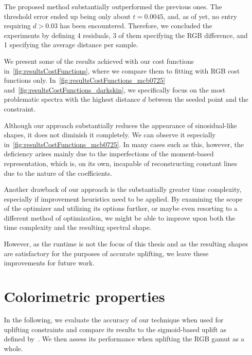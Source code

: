 The proposed method substantially outperformed the previous ones. The threshold error ended up being only about $t = 0.0045$, and, as of yet, no entry requiring $d > 0.03$ has been encountered. Therefore, we concluded the experiments by defining 4 residuals, 3 of them specifying the RGB difference, and 1 specifying the average distance per sample.

We present some of the results achieved with our cost functions in~\cref{fig:resultsCostFunctions}, where we compare them to fitting with RGB cost functions only. In~\cref{fig:resultsCostFunctions_mcb0725} and~\cref{fig:resultsCostFunctions_darkskin}, we specifically focus on the most problematic spectra with the highest distance $d$ between the seeded point and the constraint.

Although our approach substantially reduces the appearance of sinosidual-like shapes, it does not diminish it completely. We can observe it especially in~\cref{fig:resultsCostFunctions_mcb0725}. In many cases such as this, however, the deficiency arises mainly due to the imperfections of the moment-based representation, which is, on its own, incapable of reconstructing constant lines due to the nature of the coefficients.

Another drawback of our approach is the substantially greater time complexity, especially if improvement heuristics need to be applied. By examining the scope of the optimizer and utilizing its options further, or maybe even resorting to a different method of optimization, we might be able to improve upon both the time complexity and the resulting spectral shape.

However, as the runtime is not the focus of this thesis and as the resulting shapes are satisfactory for the purposes of accurate uplifting, we leave these improvements for future work.

\section{Colorimetric properties}

In the following, we evaluate the accuracy of our technique when used for uplifting constraints and compare its results to the sigmoid-based uplift as defined by~\citet{upsamplingJakobHanika}. We then assess its performance when uplifting the RGB gamut as a whole.



